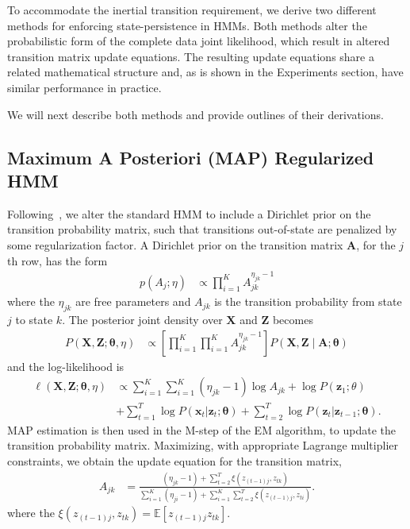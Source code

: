 \documentclass[letterpaper]{article}
\begin{document}
To accommodate the inertial transition requirement, we derive two different
methods for enforcing state-persistence in HMMs. Both methods alter the
probabilistic form of the complete data joint likelihood, which result
in altered transition matrix update equations. The resulting update equations
share a related mathematical structure and, as is shown in
the Experiments section, have similar performance in practice.

We will next describe both methods and provide outlines of their derivations. 

\subsection{Maximum A Posteriori (MAP) Regularized HMM}

Following~\cite{MAP1994}, we alter the standard HMM to include a Dirichlet prior on the transition probability matrix, such that transitions out-of-state are penalized by some regularization factor. A Dirichlet prior on the transition matrix $\mathbf{A}$, for the $j$th row, has the form
\begin{align*}
    p(A_j; \eta) &\propto \prod_{i=1}^{K} A_{jk}^{\eta_{jk}-1}
\end{align*}
where the $\eta_{jk}$ are free parameters and $A_{jk}$ is the transition probability from state $j$ to state $k$. The posterior joint density over $\mathbf{X}$ and $\mathbf{Z}$ becomes
\begin{align*}
    P(\mathbf{X}, \mathbf{Z} ; \mathbf{\theta}, \eta) 
    &\propto \left[\prod_{i=1}^{K}\prod_{i=1}^{K} A_{jk}^{\eta_{jk} - 1}\right] P(\mathbf{X}, \mathbf{Z} \mid \mathbf{A}; \mathbf{\theta}) 
\end{align*}
and the log-likelihood is
\begin{align*}
\ell(\mathbf{X}, \mathbf{Z} ; \mathbf{\theta}, \eta) 
&\propto \sum_{i=1}^{K}\sum_{i=1}^{K} (\eta_{jk} - 1)\log A_{jk} + \log P(\mathbf{z}_{1}; \theta) \\
&+ \sum_{t=1}^{T}\log P(\mathbf{x}_t|\mathbf{z}_t; \mathbf{\theta}) + \sum_{t=2}^{T}\log P(\mathbf{z}_t|\mathbf{z}_{t-1}; \mathbf{\theta}).
\end{align*}
MAP estimation is then used in the M-step of the EM algorithm, to update the transition probability matrix. Maximizing, with appropriate Lagrange multiplier constraints, we obtain the update equation for the transition matrix, 
\begin{align}
    A_{jk} &= \frac{(\eta_{jk} - 1) + \sum_{t=2}^{T} \xi(z_{(t-1)j}, z_{tk})}   
    {\sum_{i=1}^{K}(\eta_{ji} - 1) + \sum_{i=1}^{K}\sum_{t=2}^{T} \xi(z_{(t-1)j}, z_{ti})}.
\end{align}
where the $\xi(z_{(t-1)j}, z_{tk})=\mathbb{E}[z_{(t-1)j}z_{tk}]$.
\end{document}
